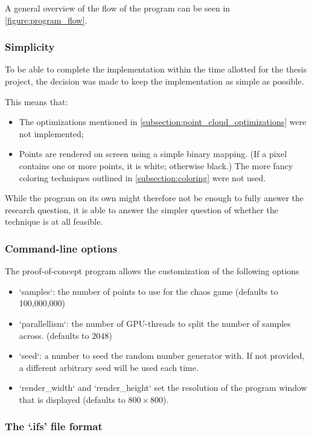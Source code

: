 \documentclass[11pt]{article}
\begin{document}
A general overview of the flow of the program can be seen in \autoref{figure:program_flow}.

\subsubsection{Simplicity}
\label{sec:org4dac0fa}

To be able to complete the implementation within the time allotted for the thesis project,
the decision was made to keep the implementation as simple as possible.

This means that:

\begin{itemize}
\item The optimizations mentioned in \autoref{subsection:point_cloud_optimizations} were not implemented;
\item Points are rendered on screen using a simple binary mapping. (If a pixel contains one or more points, it is white; otherwise black.)
The more fancy coloring techniques outlined in \autoref{subsection:coloring} were not used.
\end{itemize}

While the program on its own might therefore not be enough to fully answer the research question,
it is able to answer the simpler question of whether the technique is at all feasible.

\subsubsection{Command-line options}
\label{sec:orge3a92eb}

The proof-of-concept program allows the customization of the following options

\begin{itemize}
\item `samples`: the number of points to use for the chaos game (defaults to 100,000,000)
\item `parallellism`: the number of GPU-threads to split the number of samples across. (defaults to 2048)
\item `seed`: a number to seed the random number generator with. If not provided, a different arbitrary seed will be used each time.
\item `render\_width` and `render\_height` set the resolution of the program window that is displayed (defaults to \(800 \times 800\)).
\end{itemize}

\subsubsection{The `.ifs' file format}
\label{sec:orgf353e4b}
\end{document}
